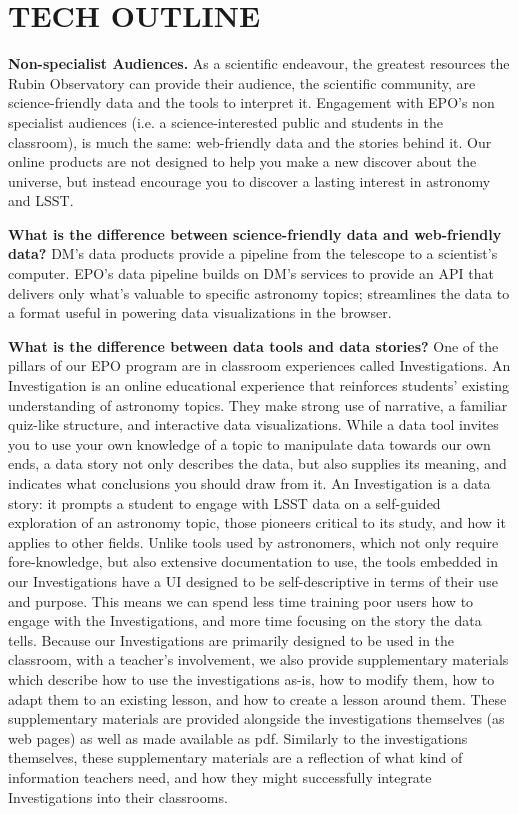 \section{TECH OUTLINE}

\textbf{Non-specialist Audiences.}
As a scientific endeavour, the greatest resources the Rubin Observatory can provide their audience, the scientific community, are science-friendly data and the tools to interpret it.  Engagement with EPO's non specialist audiences (i.e. a science-interested public and students in the classroom), is much the same: web-friendly data and the stories behind it.  Our online products are not designed to help you make a new discover about the universe, but instead encourage you to discover a lasting interest in astronomy and LSST.  

\textbf{What is the difference between science-friendly data and web-friendly data?}  
DM's data products provide a pipeline from the telescope to a scientist's computer.  EPO's data pipeline builds on DM's services to provide an API that delivers only what's valuable to specific astronomy topics; streamlines the data to a format useful in powering data visualizations in the browser.  

\textbf{What is the difference between data tools and data stories?}
One of the pillars of our EPO program are in classroom experiences called Investigations.  An Investigation is an online educational experience that reinforces students' existing understanding of astronomy topics.  They make strong use of narrative, a familiar quiz-like structure, and interactive data visualizations.  While a data tool invites you to use your own knowledge of a topic to manipulate data towards our own ends, a data story  not only describes the data, but also supplies its meaning, and indicates what conclusions you should draw from it.  An Investigation is a data story: it prompts a student to engage with LSST data on a self-guided exploration of an astronomy topic, those pioneers critical to its study, and how it applies to other fields.  Unlike tools used by astronomers, which not only require fore-knowledge, but also extensive documentation to use, the tools embedded in our Investigations have a UI designed to be self-descriptive in terms of their use and purpose.  This means we can spend less time training poor users how to engage with the Investigations, and more time focusing on the story the data tells.  Because our Investigations are primarily designed to be used in the classroom, with a teacher's involvement, we also provide supplementary materials which describe how to use the investigations as-is, how to modify them, how to adapt them to an existing lesson, and how to create a lesson around them.  These supplementary materials are provided alongside the investigations themselves (as web pages) as well as made available as pdf.  Similarly to the investigations themselves, these supplementary materials are a reflection of what kind of information teachers need, and how they might successfully integrate Investigations into their classrooms.

